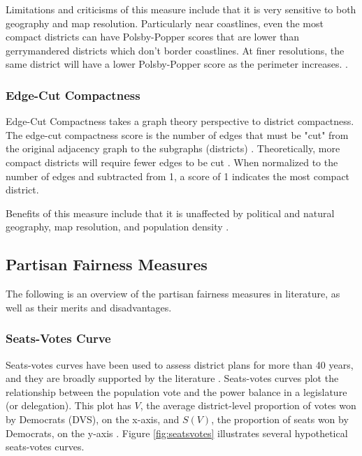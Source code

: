 Limitations and criticisms of this measure include that it is very sensitive to both geography and map resolution. Particularly near coastlines, even the most compact districts can have Polsby-Popper scores that are lower than gerrymandered districts which don't border coastlines. At finer resolutions, the same district will have a lower Polsby-Popper score as the perimeter increases. \parencite[12]{mccartan2020}.

\subsubsection{Edge-Cut Compactness}
\label{sec:edgecut}

Edge-Cut Compactness takes a graph theory perspective to district compactness. The edge-cut compactness score is the number of edges that must be "cut" from the original adjacency graph to the subgraphs (districts) \parencite{dube2016}. Theoretically, more compact districts will require fewer edges to be cut \parencite{dube2016}. When normalized to the number of edges and subtracted from 1, a score of 1 indicates the most compact district. 

Benefits of this measure include that it is unaffected by political and natural geography, map resolution, and population density \parencite[11]{mccartan2020}. 

\subsection{Partisan Fairness Measures}

The following is an overview of the partisan fairness measures in literature, as well as their merits and disadvantages. 

\subsubsection{Seats-Votes Curve}

Seats-votes curves have been used to assess district plans for more than 40 years, and they are broadly supported by the literature \parencite{katz2020}. Seats-votes curves plot the relationship between the population vote and the power balance in a legislature (or delegation). This plot has $V$, the average district-level proportion of votes won by Democrats (DVS), on the x-axis, and $S(V)$, the proportion of seats won by Democrats, on the y-axis \parencite{tufte1973}. Figure \ref{fig:seatsvotes} illustrates several hypothetical seats-votes curves.

